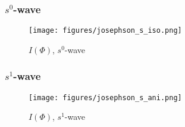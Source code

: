 \begin{frame}
\frametitle{$s^0$-wave}
\begin{figure}
    \centering
    \texttt{[image: figures/josephson\_s\_iso.png]}
    \caption{$I(\Phi)$, $s^0$-wave}
\end{figure}
\end{frame}

\begin{frame}
\frametitle{$s^1$-wave}
\begin{figure}
    \centering
    \texttt{[image: figures/josephson\_s\_ani.png]}
    \caption{$I(\Phi)$, $s^1$-wave}
\end{figure}
\end{frame}

